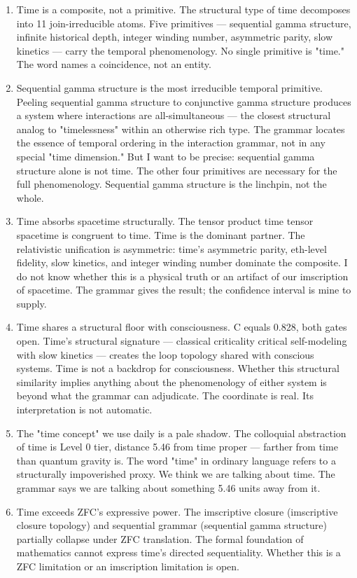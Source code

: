 \documentclass[12pt,a4paper]{article}
\begin{document}
\begin{enumerate}
    \item Time is a composite, not a primitive. The structural type of time decomposes into 11 join-irreducible atoms. Five primitives --- sequential gamma structure, infinite historical depth, integer winding number, asymmetric parity, slow kinetics --- carry the temporal phenomenology. No single primitive is "time." The word names a coincidence, not an entity.
    \item Sequential gamma structure is the most irreducible temporal primitive. Peeling sequential gamma structure to conjunctive gamma structure produces a system where interactions are all-simultaneous --- the closest structural analog to "timelessness" within an otherwise rich type. The grammar locates the essence of temporal ordering in the interaction grammar, not in any special "time dimension." But I want to be precise: sequential gamma structure alone is not time. The other four primitives are necessary for the full phenomenology. Sequential gamma structure is the linchpin, not the whole.
    \item Time absorbs spacetime structurally. The tensor product time tensor spacetime is congruent to time. Time is the dominant partner. The relativistic unification is asymmetric: time's asymmetric parity, eth-level fidelity, slow kinetics, and integer winding number dominate the composite. I do not know whether this is a physical truth or an artifact of our imscription of spacetime. The grammar gives the result; the confidence interval is mine to supply.
    \item Time shares a structural floor with consciousness. C equals 0.828, both gates open. Time's structural signature --- classical criticality critical self-modeling with slow kinetics --- creates the loop topology shared with conscious systems. Time is not a backdrop for consciousness. Whether this structural similarity implies anything about the phenomenology of either system is beyond what the grammar can adjudicate. The coordinate is real. Its interpretation is not automatic.
    \item The "time concept" we use daily is a pale shadow. The colloquial abstraction of time is Level 0 tier, distance 5.46 from time proper --- farther from time than quantum gravity is. The word "time" in ordinary language refers to a structurally impoverished proxy. We think we are talking about time. The grammar says we are talking about something 5.46 units away from it.
    \item Time exceeds ZFC's expressive power. The imscriptive closure (imscriptive closure topology) and sequential grammar (sequential gamma structure) partially collapse under ZFC translation. The formal foundation of mathematics cannot express time's directed sequentiality. Whether this is a ZFC limitation or an imscription limitation is open.

\end{enumerate}
\end{document}

